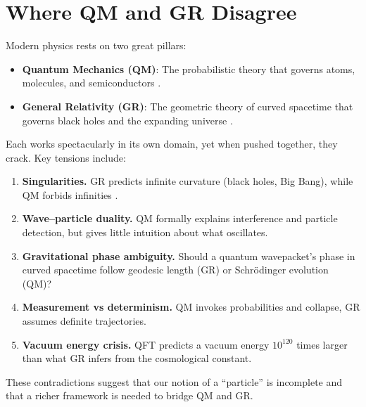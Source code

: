 \section{Where QM and GR Disagree}

Modern physics rests on two great pillars:

\begin{itemize}
  \item \textbf{Quantum Mechanics (QM)}: The probabilistic theory that governs atoms,
        molecules, and semiconductors \cite{wiki_qm}.
  \item \textbf{General Relativity (GR)}: The geometric theory of curved spacetime that
        governs black holes and the expanding universe \cite{wiki_gr}.
\end{itemize}

Each works spectacularly in its own domain, yet when pushed together, they crack. Key
tensions include:

\begin{enumerate}
  \item \textbf{Singularities.} GR predicts infinite curvature (black holes, Big Bang),
        while QM forbids infinities \cite{padmanabhan_cc}.
  \item \textbf{Wave--particle duality.} QM formally explains interference and particle
        detection, but gives little intuition about what oscillates.
  \item \textbf{Gravitational phase ambiguity.} Should a quantum wavepacket’s phase in
        curved spacetime follow geodesic length (GR) or Schrödinger evolution (QM)?
  \item \textbf{Measurement vs determinism.} QM invokes probabilities and collapse, GR
        assumes definite trajectories.
  \item \textbf{Vacuum energy crisis.} QFT predicts a vacuum energy $10^{120}$ times
        larger than what GR infers from the cosmological constant.
\end{enumerate}

These contradictions suggest that our notion of a ``particle'' is incomplete and that a
richer framework is needed to bridge QM and GR.
